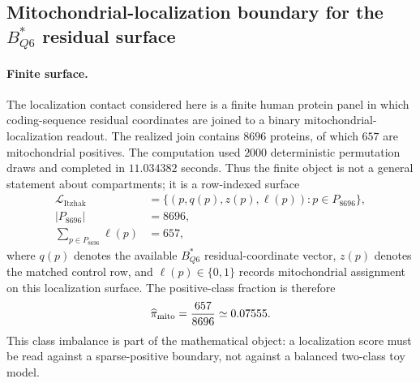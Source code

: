 
\subsection{Mitochondrial-localization boundary for the $B^{\ast}_{Q6}$ residual surface}
\label{sec:bioreality-q6-mts-localization-boundary-itzhak2016}

\paragraph{Finite surface.}
The localization contact considered here is a finite human protein panel in which coding-sequence residual coordinates are joined to a binary mitochondrial-localization readout.  The realized join contains $8696$ proteins, of which $657$ are mitochondrial positives.  The computation used $2000$ deterministic permutation draws and completed in $11.034382$ seconds.  Thus the finite object is not a general statement about compartments; it is a row-indexed surface
$$
\begin{aligned}
  \mathcal{L}_{\mathrm{Itzhak}} &= \{(p, q(p), z(p), \ell(p)) : p \in P_{8696}\},\\
  |P_{8696}| &= 8696,\\
  \sum_{p\in P_{8696}} \ell(p) &= 657,
\end{aligned}
$$
where $q(p)$ denotes the available $B^{\ast}_{Q6}$ residual-coordinate vector, $z(p)$ denotes the matched control row, and $\ell(p)\in\{0,1\}$ records mitochondrial assignment on this localization surface.  The positive-class fraction is therefore
$$
\begin{aligned}
  \widehat{\pi}_{\mathrm{mito}} = {657 \over 8696} \simeq 0.07555 .
\end{aligned}
$$
This class imbalance is part of the mathematical object: a localization score must be read against a sparse-positive boundary, not against a balanced two-class toy model.

